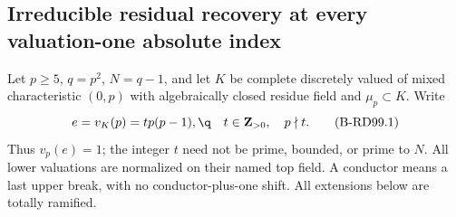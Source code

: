 \subsection{Irreducible residual recovery at every valuation-one absolute index}

Let $p\ge5$, $q=p^2$, $N=q-1$, and let $K$ be complete
discretely valued of mixed characteristic $(0,p)$ with algebraically
closed residue field and $\mu_p\subset K$. Write
\[
 e=v_K(p)=tp(p-1),\q\quad t\in\mathbf Z_{>0},\quad p\nmid t.
                                                        \tag{B-RD99.1}
\]
Thus $v_p(e)=1$; the integer $t$ need not be prime, bounded,
or prime to $N$. All lower valuations are normalized on their
named top field. A conductor means a last upper break, with no
conductor-plus-one shift. All extensions below are totally ramified.

